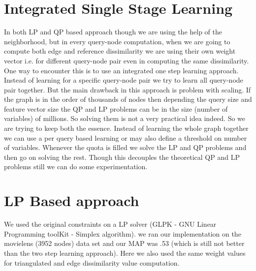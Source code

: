\section*{Integrated Single Stage Learning}
In both LP and QP based approach though we are using the help of the neighborhood, but in every query-node computation, when we are going to compute both edge and reference dissimilarity we are using their own weight vector i.e. for different query-node pair even in computing the same dissimilarity. One way to encounter this is to use an integrated one step learning approach. Instead of learning for a specific query-node pair we try to learn all query-node pair together. But the main drawback in this approach is problem with scaling. If the graph is in the order of thousands of nodes then depending the query size and feature vector size the QP and LP problems can be in the size (number of variables) of millions. So solving them is not a very practical idea indeed. So we are trying to keep both the essence. Instead of learning the whole graph together we can use a per query based learning or may also define a threshold on number of variables. Whenever the quota is filled we solve the LP and QP problems and then go on solving the rest. Though this decouples the theoretical QP and LP problems still we can do some experimentation.



\section*{LP Based approach}
We used the original constraints on a LP solver (GLPK - GNU Linear Programming toolKit - Simplex algorithm). we ran our implementation on the movielens (3952 nodes) data set and our MAP was .53 (which is still not better than the two step learning approach). Here we also used the same weight values for triangulated and edge dissimilarity value computation.

   
